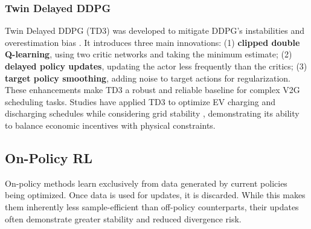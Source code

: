 \subsubsection{Twin Delayed DDPG}

Twin Delayed DDPG (TD3) was developed to mitigate DDPG's instabilities and overestimation bias \cite{fujimoto2018addressing}. It introduces three main innovations: 
(1) \textbf{clipped double Q-learning}, using two critic networks and taking the minimum estimate; 
(2) \textbf{delayed policy updates}, updating the actor less frequently than the critics; 
(3) \textbf{target policy smoothing}, adding noise to target actions for regularization. 
\\
\noindent
These enhancements make TD3 a robust and reliable baseline for complex V2G scheduling tasks. Studies have applied TD3 to optimize EV charging and discharging schedules while considering grid stability \cite{Dou, Ding}, demonstrating its ability to balance economic incentives with physical constraints.

\subsection{On-Policy RL}

On-policy methods learn exclusively from data generated by current policies being optimized. Once data is used for updates, it is discarded. While this makes them inherently less sample-efficient than off-policy counterparts, their updates often demonstrate greater stability and reduced divergence risk.

